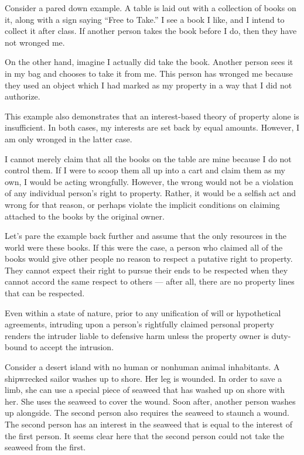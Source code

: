 \documentclass[12pt]{book}
\begin{document}
	Consider a pared down example. A table is laid out with a collection of
	books on it, along with a sign saying “Free to Take.” I see a book I like,
	and I intend to collect it after class. If another person takes the book
	before I do, then they have not wronged me.

	On the other hand, imagine I actually did take the book. Another person
	sees it in my bag and chooses to take it from me. This person has wronged
	me because they used an object which I had marked as my property in a way
	that I did not authorize.

	This example also demonstrates that an interest-based theory of property
	alone is insufficient. In both cases, my interests are set back by equal
	amounts. However, I am only wronged in the latter case.

	I cannot merely claim that all the books on the table are mine because I do
	not control them. If I were to scoop them all up into a cart and claim them
	as my own, I would be acting wrongfully. However, the wrong would not be
	a violation of any individual person’s right to property. Rather, it would
	be a selfish act and wrong for that reason, or perhaps violate the implicit
	conditions on claiming attached to the books by the original owner.

	Let’s pare the example back further and assume that the only resources in
	the world were these books. If this were the case, a person who claimed all
	of the books would give other people no reason to respect a putative right
	to property. They cannot expect their right to pursue their ends to be
	respected when they cannot accord the same respect to others --- after all,
	there are no property lines that can be respected.

	Even within a state of nature, prior to any unification of will or
	hypothetical agreements, intruding upon a person’s rightfully claimed
	personal property renders the intruder liable to defensive harm unless the
	property owner is duty-bound to accept the intrusion.

	Consider a desert island with no human or nonhuman animal inhabitants.
	A shipwrecked sailor washes up to shore. Her leg is wounded. In order to
	save a limb, she can use a special piece of seaweed that has washed up on
	shore with her. She uses the seaweed to cover the wound. Soon after, another
	person washes up alongside. The second person also requires the seaweed to
	staunch a wound. The second person has an interest in the seaweed that is
	equal to the interest of the first person. It seems clear here that the
	second person could not take the seaweed from the first.
\end{document}
